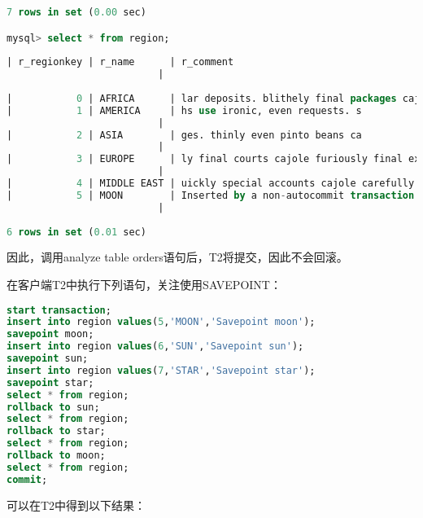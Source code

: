 \documentclass{article}
\begin{document}
\begin{lstlisting}[language=sql]
7 rows in set (0.00 sec)

mysql> select * from region;
  
| r_regionkey | r_name      | r_comment
                          |
  
|           0 | AFRICA      | lar deposits. blithely final packages cajole. regular waters are final requests. regular accounts are according to  |
|           1 | AMERICA     | hs use ironic, even requests. s
                          |
|           2 | ASIA        | ges. thinly even pinto beans ca
                          |
|           3 | EUROPE      | ly final courts cajole furiously final excuse
                          |
|           4 | MIDDLE EAST | uickly special accounts cajole carefully blithely close requests. carefully final asymptotes haggle furiousl        |
|           5 | MOON        | Inserted by a non-autocommit transaction.
                          |
  
6 rows in set (0.01 sec)
\end{lstlisting}

因此，调用analyze table orders语句后，T2将提交，因此不会回滚。

在客户端T2中执行下列语句，关注使用SAVEPOINT：

\begin{lstlisting}[language=sql]
start transaction;
insert into region values(5,'MOON','Savepoint moon');
savepoint moon;
insert into region values(6,'SUN','Savepoint sun');
savepoint sun;
insert into region values(7,'STAR','Savepoint star');
savepoint star;
select * from region;
rollback to sun;
select * from region;
rollback to star;
select * from region;
rollback to moon;
select * from region;
commit;
\end{lstlisting}

可以在T2中得到以下结果：
\end{document}
